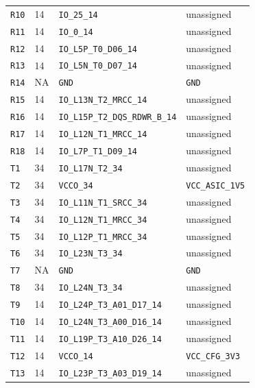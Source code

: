 \documentclass[11pt,a4paper]{article}
\begin{document}
\begin{longtable}{@{}P{13mm}P{13mm}P{78mm}P{62mm}@{}}
\nolinkurl{R10} & 14 & \nolinkurl{IO_25_14} & \textcolor{muted}{unassigned} \\
\nolinkurl{R11} & 14 & \nolinkurl{IO_0_14} & \textcolor{muted}{unassigned} \\
\nolinkurl{R12} & 14 & \nolinkurl{IO_L5P_T0_D06_14} & \textcolor{muted}{unassigned} \\
\nolinkurl{R13} & 14 & \nolinkurl{IO_L5N_T0_D07_14} & \textcolor{muted}{unassigned} \\
\nolinkurl{R14} & NA & \nolinkurl{GND} & \nolinkurl{GND} \\
\nolinkurl{R15} & 14 & \nolinkurl{IO_L13N_T2_MRCC_14} & \textcolor{muted}{unassigned} \\
\nolinkurl{R16} & 14 & \nolinkurl{IO_L15P_T2_DQS_RDWR_B_14} & \textcolor{muted}{unassigned} \\
\nolinkurl{R17} & 14 & \nolinkurl{IO_L12N_T1_MRCC_14} & \textcolor{muted}{unassigned} \\
\nolinkurl{R18} & 14 & \nolinkurl{IO_L7P_T1_D09_14} & \textcolor{muted}{unassigned} \\
\nolinkurl{T1} & 34 & \nolinkurl{IO_L17N_T2_34} & \textcolor{muted}{unassigned} \\
\nolinkurl{T2} & 34 & \nolinkurl{VCCO_34} & \nolinkurl{VCC_ASIC_1V5} \\
\nolinkurl{T3} & 34 & \nolinkurl{IO_L11N_T1_SRCC_34} & \textcolor{muted}{unassigned} \\
\nolinkurl{T4} & 34 & \nolinkurl{IO_L12N_T1_MRCC_34} & \textcolor{muted}{unassigned} \\
\nolinkurl{T5} & 34 & \nolinkurl{IO_L12P_T1_MRCC_34} & \textcolor{muted}{unassigned} \\
\nolinkurl{T6} & 34 & \nolinkurl{IO_L23N_T3_34} & \textcolor{muted}{unassigned} \\
\nolinkurl{T7} & NA & \nolinkurl{GND} & \nolinkurl{GND} \\
\nolinkurl{T8} & 34 & \nolinkurl{IO_L24N_T3_34} & \textcolor{muted}{unassigned} \\
\nolinkurl{T9} & 14 & \nolinkurl{IO_L24P_T3_A01_D17_14} & \textcolor{muted}{unassigned} \\
\nolinkurl{T10} & 14 & \nolinkurl{IO_L24N_T3_A00_D16_14} & \textcolor{muted}{unassigned} \\
\nolinkurl{T11} & 14 & \nolinkurl{IO_L19P_T3_A10_D26_14} & \textcolor{muted}{unassigned} \\
\nolinkurl{T12} & 14 & \nolinkurl{VCCO_14} & \nolinkurl{VCC_CFG_3V3} \\
\nolinkurl{T13} & 14 & \nolinkurl{IO_L23P_T3_A03_D19_14} & \textcolor{muted}{unassigned} \\

\end{longtable}
\end{document}
